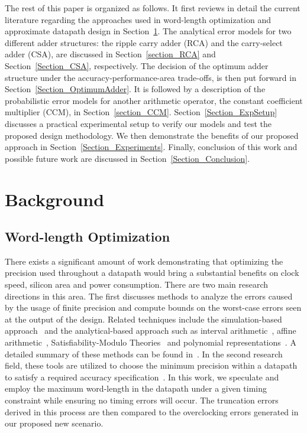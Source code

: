 \documentclass[prodmode,acmtrets]{acmsmall} %
\begin{document}
The rest of this paper is organized as follows. It first reviews in detail the current literature regarding the approaches used in word-length optimization and approximate datapath design in Section~\ref{Section_Background}. The analytical error models for two different adder structures: the ripple carry adder (RCA) and the carry-select adder (CSA), are discussed in Section~\ref{section_RCA} and Section~\ref{Section_CSA}, respectively. The decision of the optimum adder structure under the accuracy-performance-area trade-offs, is then put forward in Section~\ref{Section_OptimumAdder}. It is followed by a description of the probabilistic error models for another arithmetic operator, the constant coefficient multiplier (CCM), in Section~\ref{section_CCM}. Section~\ref{Section_ExpSetup} discusses a practical experimental setup to verify our models and test the proposed design methodology. We then demonstrate the benefits of our proposed approach in Section~\ref{Section_Experiments}. Finally, conclusion of this work and possible future work are discussed in Section~\ref{Section_Conclusion}. 

\section{Background}\label{Section_Background}
\subsection{Word-length Optimization}\label{Section_Background_WL}
There exists a significant amount of work demonstrating that optimizing the precision used throughout a datapath would bring a substantial benefits on clock speed, silicon area and power consumption. There are two main research directions in this area. The first discusses methods to analyze the errors caused by the usage of finite precision and compute bounds on the worst-case errors seen at the output of the design. Related techniques include the simulation-based approach~\cite{SungWLop_Simulation} and the analytical-based approach such as interval arithmetic~\cite{moore1966IA}, affine arithmetic~\cite{de2004affine}, Satisfiability-Modulo Theories~\cite{SAT2010} and polynomial representations~\cite{Boland2011TCAD}. A detailed summary of these methods can be found in~\cite{GeorgeDT11,lee2006accuracy}. In the second research field, these tools are utilized to choose the minimum precision within a datapath to satisfy a required accuracy specification~\cite{RoldaoWLop_Simulation}. In this work, we speculate and employ the maximum word-length in the datapath under a given timing constraint while ensuring no timing errors will occur. The truncation errors derived in this process are then compared to the overclocking errors generated in our proposed new scenario.
\end{document}
